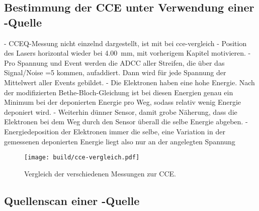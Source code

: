 \FloatBarrier
\subsection{Bestimmung der CCE unter Verwendung einer \texorpdfstring{}{Sr}-Quelle}
\label{sec:CCEQ-Auswertung}

- CCEQ-Messung nicht einzelnd dargestellt, ist mit bei cce-vergleich
- Position des Lasers horizontal wieder bei \SI{4.00}{\milli\meter}, mit vorherigem
Kapitel motivieren.
- Pro Spannung und Event werden die ADCC aller Streifen, die über das Signal/Noise =5
kommen, aufaddiert. Dann wird für jede Spannung der Mittelwert aller Events gebildet.
- Die Elektronen haben eine hohe Energie. Nach der modifizierten Bethe-Bloch-Gleichung
ist bei diesen Energien genau ein Minimum bei der deponierten Energie pro Weg, sodass
relativ wenig Energie deponiert wird.
- Weiterhin dünner Sensor, damit grobe Näherung, dass die Elektronen bei dem Weg durch
den Sensor überall die selbe Energie abgeben.
- Energiedeposition der Elektronen immer die selbe, eine Variation in der gemessenen
deponierten Energie liegt also nur an der angelegten Spannung
\begin{figure}
  \centering
  \texttt{[image: build/cce-vergleich.pdf]}  %
  \caption{Vergleich der verschiedenen Messungen zur CCE.}
  \label{fig:cce-vergleich}
\end{figure}

\FloatBarrier
\subsection{Quellenscan einer \texorpdfstring{}{Sr}-Quelle}
\label{sec:Quellenscan-Auswertung}

